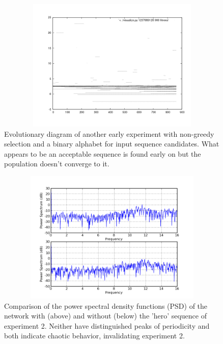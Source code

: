\documentclass[12pt]{article}
\begin{document}
\begin{figure}[htb]
\begin{center}
\includegraphics[height=2.5in,width=4.5in]{images/early_exp_non_greedy.png}
\caption{Evolutionary diagram of another early experiment with non-greedy selection and a binary alphabet for input sequence candidates.  What appears to be an acceptable sequence is found early on but the population doesn't converge to it.}
\end{center}
\end{figure}
\begin{figure}[htb]
\begin{center}
\includegraphics[height=2.5in,width=4.5in]{images/big_run_psd_small_amp.png}
\caption{Comparison of the power spectral density functions (PSD) of the
network with (above) and without (below) the 'hero' sequence of experiment 2.  Neither have distinguished peaks of periodicity and both indicate chaotic behavior, invalidating experiment 2.}
\end{center}
\end{figure}
\end{document}
